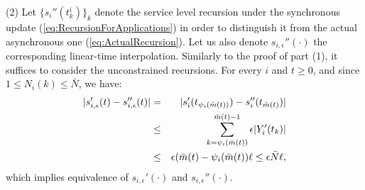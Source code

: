 \documentclass[letter,11pt]{article}
\begin{document}
(2) Let $\{s_i''(t_k^i)\}_k$ denote the service level recursion under the synchronous update (\ref{eq:RecursionForApplications}) in order to distinguish it from the actual asynchronous one (\ref{eq:ActualRecursion}). Let us also denote $s_{i,\epsilon}''(\cdot)$ the corresponding linear-time interpolation. Similarly to the proof of part (1), it suffices to consider the unconstrained recursions. For every $i$ and $t\geq{0}$, and since $1\leq N_i(k)\leq\bar{N}$, we have:
\begin{eqnarray*}
 \vert s_{i,\epsilon}'(t) - s_{i,\epsilon}''(t) \vert & = & \vert s_i'(t_{\psi_i(\bar{m}(t))}) - s_i''(t_{\bar{m}(t)}) \vert \cr 
 & \leq & \sum_{k=\psi_i(\bar{m}(t))}^{\bar{m}(t)-1}\epsilon \vert Y_{i}'(t_k) \vert \cr
 & \leq & \epsilon (\bar{m}(t) - \psi_i(\bar{m}(t)) \ell \leq \epsilon \bar{N} \ell,
\end{eqnarray*}
which implies equivalence of $s_{i,\epsilon}'(\cdot)$ and $s_{i,\epsilon}''(\cdot)$.

 

 
\end{document}

